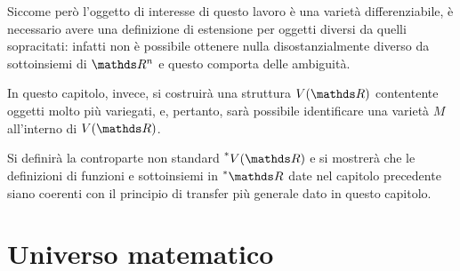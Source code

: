 Siccome però l'oggetto di interesse di questo lavoro è una varietà differenziabile, è necessario avere una definizione di estensione per oggetti diversi da quelli sopracitati: infatti non è possibile ottenere nulla disostanzialmente diverso da sottoinsiemi di $ \R^{n} $ e questo comporta delle ambiguità.

In questo capitolo, invece, si costruirà una struttura $ V(\R) $ contentente oggetti molto più variegati, e, pertanto, sarà possibile identificare una varietà $ M $ all'interno di $ V(\R) $.

Si definirà la controparte non standard $ \nonstandard{V(\R)} $ e si mostrerà che le definizioni di funzioni e sottoinsiemi in $ \starR $ date nel capitolo precedente siano coerenti con il principio di transfer più generale dato in questo capitolo. 

\section{Universo matematico}


